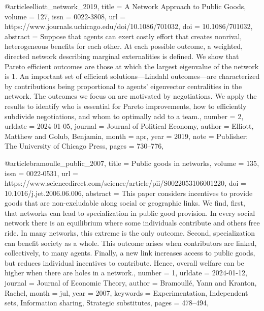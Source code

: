 {{{@article{elliott_network_2019,
	title = {A {Network} {Approach} to {Public} {Goods}},
	volume = {127},
	issn = {0022-3808},
	url = {https://www.journals.uchicago.edu/doi/10.1086/701032},
	doi = {10.1086/701032},
	abstract = {Suppose that agents can exert costly effort that creates nonrival, heterogeneous benefits for each other. At each possible outcome, a weighted, directed network describing marginal externalities is defined. We show that Pareto efficient outcomes are those at which the largest eigenvalue of the network is 1. An important set of efficient solutions—Lindahl outcomes—are characterized by contributions being proportional to agents’ eigenvector centralities in the network. The outcomes we focus on are motivated by negotiations. We apply the results to identify who is essential for Pareto improvements, how to efficiently subdivide negotiations, and whom to optimally add to a team.},
	number = {2},
	urldate = {2024-01-05},
	journal = {Journal of Political Economy},
	author = {Elliott, Matthew and Golub, Benjamin},
	month = apr,
	year = {2019},
	note = {Publisher: The University of Chicago Press},
	pages = {730--776},
}

@article{bramoulle_public_2007,
	title = {Public goods in networks},
	volume = {135},
	issn = {0022-0531},
	url = {https://www.sciencedirect.com/science/article/pii/S0022053106001220},
	doi = {10.1016/j.jet.2006.06.006},
	abstract = {This paper considers incentives to provide goods that are non-excludable along social or geographic links. We find, first, that networks can lead to specialization in public good provision. In every social network there is an equilibrium where some individuals contribute and others free ride. In many networks, this extreme is the only outcome. Second, specialization can benefit society as a whole. This outcome arises when contributors are linked, collectively, to many agents. Finally, a new link increases access to public goods, but reduces individual incentives to contribute. Hence, overall welfare can be higher when there are holes in a network.},
	number = {1},
	urldate = {2024-01-12},
	journal = {Journal of Economic Theory},
	author = {Bramoullé, Yann and Kranton, Rachel},
	month = jul,
	year = {2007},
	keywords = {Experimentation, Independent sets, Information sharing, Strategic substitutes},
	pages = {478--494},
}

}}}
